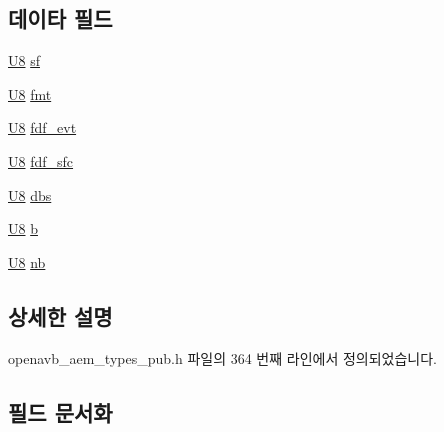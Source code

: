 \subsection*{데이타 필드}
\begin{DoxyCompactItemize}
\item 
\hyperlink{openavb__types__base__pub_8h_aa63ef7b996d5487ce35a5a66601f3e73}{U8} \hyperlink{structopenavb__aem__stream__format__iec__61883__6__t_a153db177c2b7653917dff143e5f755e1}{sf}
\item 
\hyperlink{openavb__types__base__pub_8h_aa63ef7b996d5487ce35a5a66601f3e73}{U8} \hyperlink{structopenavb__aem__stream__format__iec__61883__6__t_ab88030d1822b822615cede2168f1c31e}{fmt}
\item 
\hyperlink{openavb__types__base__pub_8h_aa63ef7b996d5487ce35a5a66601f3e73}{U8} \hyperlink{structopenavb__aem__stream__format__iec__61883__6__t_a5face0fe6e253b8041386eaa28f73800}{fdf\+\_\+evt}
\item 
\hyperlink{openavb__types__base__pub_8h_aa63ef7b996d5487ce35a5a66601f3e73}{U8} \hyperlink{structopenavb__aem__stream__format__iec__61883__6__t_a637053a40379dcc42801b92779cd870e}{fdf\+\_\+sfc}
\item 
\hyperlink{openavb__types__base__pub_8h_aa63ef7b996d5487ce35a5a66601f3e73}{U8} \hyperlink{structopenavb__aem__stream__format__iec__61883__6__t_abed3ffe3c3261fb920ef333f76a290bd}{dbs}
\item 
\hyperlink{openavb__types__base__pub_8h_aa63ef7b996d5487ce35a5a66601f3e73}{U8} \hyperlink{structopenavb__aem__stream__format__iec__61883__6__t_a8921ab436782828cd4262390e8b01eb7}{b}
\item 
\hyperlink{openavb__types__base__pub_8h_aa63ef7b996d5487ce35a5a66601f3e73}{U8} \hyperlink{structopenavb__aem__stream__format__iec__61883__6__t_a023f12d5e389074b0205b2ff18a0db54}{nb}
\end{DoxyCompactItemize}


\subsection{상세한 설명}


openavb\+\_\+aem\+\_\+types\+\_\+pub.\+h 파일의 364 번째 라인에서 정의되었습니다.



\subsection{필드 문서화}
